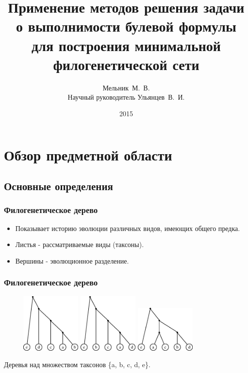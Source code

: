 \documentclass[hyperref={unicode}]{beamer}
\title{Применение методов решения задачи о выполнимости булевой формулы для построения минимальной филогенетической сети}
\author[]{Мельник~М.~В.\\
Научный руководитель Ульянцев~В.~И.}
\institute{Университет~ИТМО}
\date[]{2015}
\begin{document}
\begin{frame}
  \titlepage
\end{frame}

\section{Обзор предметной области}

\subsection{Основные определения}

\begin{frame}
\frametitle{Филогенетическое дерево}

\begin{itemize}
	\item Показывает историю эволюции различных видов, имеющих общего предка.
	\item Листья - рассматриваемые виды (таксоны).
	\item Вершины - эволюционное разделение.	
\end{itemize}

\end{frame} 


\begin{frame}
\frametitle{Филогенетическое дерево}

\centering

\begin{figure}[t]
	\includegraphics[width=3cm]{img/inp1.eps}
	\hspace{5mm}
	\includegraphics[width=3cm]{img/inp2.eps}
	\hspace{5mm}
	\includegraphics[width=3cm]{img/inp3.eps}
\end{figure}

Деревья над множеством таксонов \{a, b, c, d, e\}.

\end{frame}
\end{document}
